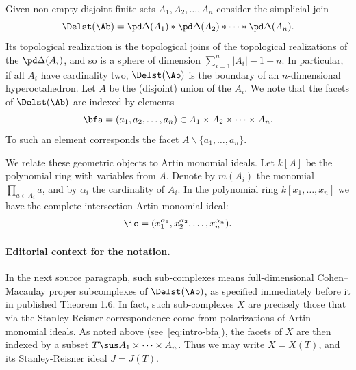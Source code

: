 \setcounter{equation}{0}
Given non-empty disjoint
finite sets $A_1, A_2, \ldots, A_n$ consider the simplicial join
\begin{equation*}
  \Delst(\Ab) = \pd \Delta(A_1) * \pd \Delta(A_2) * \cdots * \pd \Delta(A_n).
 \end{equation*}
 Its topological realization is the topological joins of the
 topological realizations of the $\pd \Delta(A_i)$,
 and so is a sphere of dimension $\sum_{i = 1}^n |A_i| - 1 - n$.
 In particular, if all $A_i$ have cardinality two, $\Delst(\Ab)$
 is the boundary of an $n$-dimensional hyperoctahedron.
 Let $A$ be the (disjoint) union of the $A_i$. We note that the facets
 of $\Delst(\Ab)$ are indexed by elements
 \begin{equation} \label{eq:intro-bfa}
   \bfa = (a_1, a_2, \ldots, a_n)  \in A_1 \times A_2 \times
   \cdots \times A_n.
   \end{equation}
 To such an element corresponds the facet $A \backslash \{a_1, \ldots, a_n\}$. 

  We relate these geometric objects to Artin monomial ideals.
 Let $k[A]$ be the
 polynomial ring with variables from $A$. Denote by $m(A_i)$
 the monomial $\prod_{a \in A_i} a$, and by $\alpha_i$  the cardinality of $A_i$. 
In the polynomial ring $k[x_1, \ldots, x_n]$ we have the complete
 intersection Artin monomial ideal:
 \begin{align*}
   \ic = (x_1^{\alpha_1}, x_2^{\alpha_2}, \ldots, x_n^{\alpha_n}).
 \end{align*}

\paragraph{Editorial context for the notation.} In the next source paragraph, such sub-complexes means full-dimensional Cohen--Macaulay proper subcomplexes of $\Delst(\Ab)$, as specified immediately before it in published Theorem 1.6.
In fact, such sub-complexes $X$ are precisely those that via the
Stanley-Reisner correspondence come from polarizations of Artin
monomial ideals. 
As noted above
  (see~\eqref{eq:intro-bfa}), the facets of
  $X$ are then indexed by a subset $T \sus A_1 \times \cdots \times A_n$.
  Thus we may write $X = X(T)$, and its Stanley-Reisner ideal $J = J(T)$.

